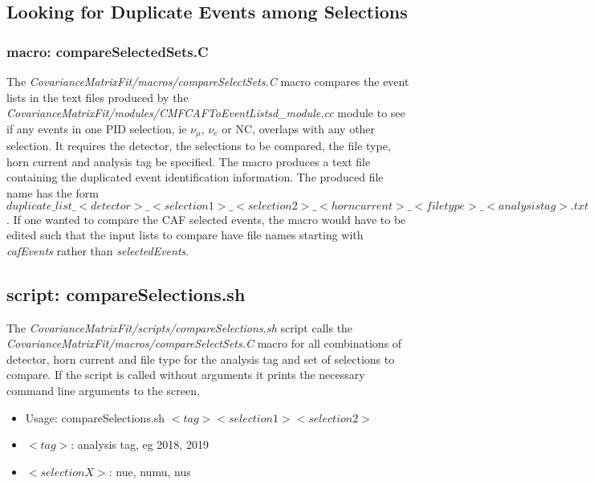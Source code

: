 \subsection{Looking for Duplicate Events among Selections}

\subsubsection{macro: compareSelectedSets.C}

The {\it CovarianceMatrixFit/macros/compareSelectSets.C} macro compares the event lists in the text files produced by the {\it CovarianceMatrixFit/modules/CMFCAFToEventListsd\_module.cc} module to see if any events in one PID selection, ie $\nu_{\mu}$, $\nu_{e}$ or NC, overlaps with any other selection.  It requires the detector, the selections to be compared, the file type, horn current and analysis tag be specified.  The macro produces a text file containing the duplicated event identification information.  The produced file name has the form $duplicate\_list\_<detector>\_<selection 1>\_<selection 2>\_<horn current>\_<file type>\_<analysis tag>.txt$.  If one wanted to compare the CAF selected events, the macro would have to be edited such that the input lists to compare have file names starting with {\it cafEvents} rather than {\it selectedEvents}.

\subsection{script: compareSelections.sh}

The {\it CovarianceMatrixFit/scripts/compareSelections.sh} script calls the {\it CovarianceMatrixFit/macros/compareSelectSets.C} macro for all combinations of detector, horn current and file type for the analysis tag and set of selections to compare. If the script is called without arguments it prints the necessary command line arguments to the screen,
\begin{itemize}
  \item Usage: compareSelections.sh $<tag> <selection 1> <selection 2>$
  \item $<tag>$: analysis tag, eg 2018, 2019
  \item $<selection X>$: nue, numu, nus
\end{itemize}
